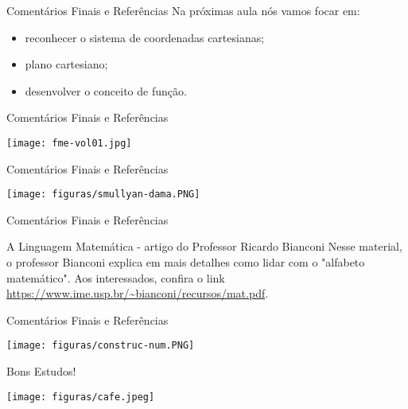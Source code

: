 \documentclass[10pt]{beamer}
\renewcommand{\indent}{\hspace*{2em}}
\theoremstyle{plain}
\begin{document}
\begin{frame}{Comentários Finais e Referências}
\indent Na próximas aula nós vamos focar em:
\begin{itemize}
    \item reconhecer o sistema de coordenadas cartesianas;
    \item plano cartesiano;
    \item desenvolver o conceito de função.
\end{itemize}
\end{frame}

\begin{frame}{Comentários Finais e Referências}
 \begin{center}
  \texttt{[image: fme-vol01.jpg]}
 \end{center}
\end{frame}

\begin{frame}{Comentários Finais e Referências}
 \begin{center}
  \texttt{[image: figuras/smullyan-dama.PNG]}
 \end{center}
\end{frame}

\begin{frame}{Comentários Finais e Referências}
 \begin{block}{A Linguagem Matemática - artigo do Professor Ricardo Bianconi}
 \vfill\indent Nesse material, o professor Bianconi explica em mais detalhes como lidar com o "alfabeto matemático". Aos interessados, confira o link \url{https://www.ime.usp.br/~bianconi/recursos/mat.pdf}.
 \end{block}
\end{frame}

\begin{frame}{Comentários Finais e Referências}
 \begin{center}
  \texttt{[image: figuras/construc-num.PNG]}
 \end{center}
\end{frame}

\begin{frame}{Bons Estudos!}
 \begin{center}
  \texttt{[image: figuras/cafe.jpeg]}
 \end{center}
\end{frame}


%   
%   

\end{document}
